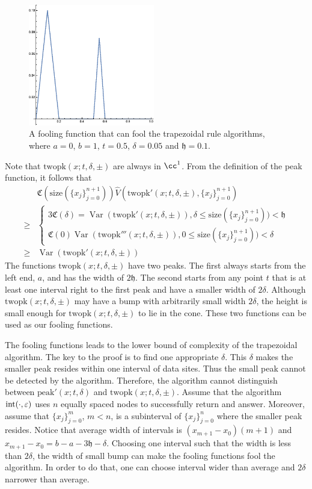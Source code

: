 \documentclass{iitthesis}
\DeclareMathOperator{\Var}{Var}
\theoremstyle{definition}
\theoremstyle{remark}
\begin{document}
\begin{figure}[h]
\centering
\includegraphics[width=5.5cm]{twopk.eps}
\caption{A fooling function that can fool the trapezoidal rule algorithms, where $a=0$, $b=1$, $t=0.5$, $\delta=0.05$ and $\mathfrak{h}=0.1$. \label{fig:twopkfunction}}
\end{figure}
Note that $\text{twopk}(x;t,\delta,\pm)$ are always in $\cc^1$.
From the definition of the peak function, it follows that
\begin{align*}
  &\mathfrak{C}(\text{size}(\{x_j\}_{j=0}^{n+1}))\widehat{V}(\text{twopk}'(x;t,\delta,\pm),\{x_j\}_{j=0}^{n+1})\\
  \ge & \begin{cases} \displaystyle 3\mathfrak{C}(\delta)=\Var(\text{twopk}'(x;t,\delta,\pm)), \delta \le \text{size}(\{x_j\}_{j=0}^{n+1})) <\mathfrak{h}\\[1ex]
                      \displaystyle \mathfrak{C}(0)\Var(\text{twopk}'''(x;t,\delta,\pm)), 0\le \text{size}(\{x_j\}_{j=0}^{n+1}))<\delta
        \end{cases}\\
  \ge & \Var(\text{twopk}'(x;t,\delta,\pm))
\end{align*}
The functions $\text{twopk}(x;t,\delta,\pm)$ have two peaks. The first always starts from the left end, $a$, and has the width of $2\mathfrak{h}$. The second starts from any point $t$ that is at least one interval right to the first peak and have a smaller width of $2\delta$. Although $\text{twopk}(x;t,\delta,\pm)$ may have a bump with arbitrarily small width $2\delta$, the height is small enough for $\text{twopk}(x;t,\delta,\pm)$ to lie in the cone. These two functions can be used as our fooling functions.

The fooling functions leads to the lower bound of complexity of the trapezoidal algorithm. The key to the proof is to find one appropriate $\delta$.  This $\delta$ makes the smaller peak resides within one interval of data sites. Thus the small peak cannot be detected by the algorithm. Therefore, the algorithm cannot distinguish between $\text{peak}'(x;t,\delta)$ and $\text{twopk}(x;t,\delta,\pm)$. Assume that the algorithm $\textup{int}(\cdot,\varepsilon)$ uses $n$ equally spaced nodes to successfully return and answer. Moreover, assume that $\{x_{j}\}_{j=0}^{m}$, $m<n$, is a subinterval of $\{x_{j}\}_{j=0}^{n}$ where the smaller peak resides. Notice that average width of intervals is $(x_{m+1}-x_{0})(m+1)$ and $x_{m+1}-x_{0}=b-a-3\mathfrak{h}-\delta$. Choosing one interval such that the width is less than $2\delta$, the width of small bump can make the fooling functions fool the algorithm. In order to do that, one can choose interval wider than average and $2\delta$ narrower than average.
\end{document}
